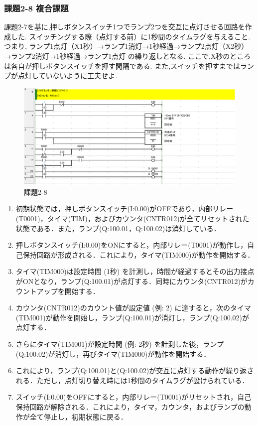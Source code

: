 \subsubsection*{課題2-8 複合課題}
課題2-7を基に,押しボタンスイッチ1つでランプ2つを交互に点灯させる回路を作成した.
スイッチングする際（点灯する前）に1秒間のタイムラグを与えること.
つまり,
ランプ1点灯（X1秒）→ランプ1消灯→1秒経過→ランプ2点灯（X2秒）→ランプ2消灯→1秒経過→ランプ1点灯
の繰り返しとなる.
ここで,X秒のところは各自が押しボタンスイッチを押す間隔である.
また,スイッチを押すまではランプが点灯していないように工夫せよ.
\begin{figure}[H]
  \centering
  \includegraphics[scale=1]{sozai/2-8-crop.pdf}
  \caption{課題2-8}
\end{figure}

\begin{enumerate}
  \item 初期状態では，押しボタンスイッチ(I:0.00)がOFFであり，内部リレー(T0001)，タイマ(TIM)，およびカウンタ(CNTR012)が全てリセットされた状態である．また，ランプ(Q:100.01，Q:100.02)は消灯している．
  \item 押しボタンスイッチ(I:0.00)をONにすると，内部リレー(T0001)が動作し，自己保持回路が形成される．これにより，タイマ(TIM000)が動作を開始する．
  \item タイマ(TIM000)は設定時間 (1秒) を計測し，時間が経過するとその出力接点がONとなり，ランプ(Q:100.01)が点灯する．同時にカウンタ(CNTR012)がカウントアップを開始する．
  \item カウンタ(CNTR012)のカウント値が設定値 (例: 2) に達すると，次のタイマ(TIM001)が動作を開始し，ランプ(Q:100.01)が消灯し，ランプ(Q:100.02)が点灯する．
  \item さらにタイマ(TIM001)が設定時間 (例: 2秒) を計測した後，ランプ(Q:100.02)が消灯し，再びタイマ(TIM000)が動作を開始する．
  \item これにより，ランプ(Q:100.01)と(Q:100.02)が交互に点灯する動作が繰り返される．ただし，点灯切り替え時には1秒間のタイムラグが設けられている．
  \item スイッチ(I:0.00)をOFFにすると，内部リレー(T0001)がリセットされ，自己保持回路が解除される．これにより，タイマ，カウンタ，およびランプの動作が全て停止し，初期状態に戻る．
\end{enumerate}


